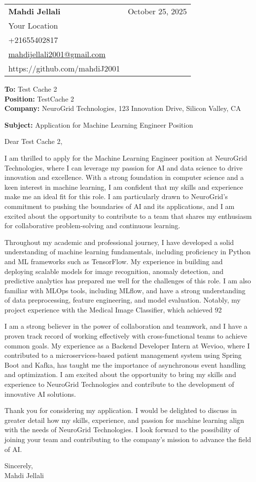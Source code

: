 \documentclass[letterpaper,11pt]{article}
\makeatletter
\newcommand{\letterHeading}[5]{
    \begin{tabular*}{\textwidth}{l@{\extracolsep{\fill}}r}
    \textbf{\Large #1} & #5 \\  %
    #2 & \\
    #3 & \\
    #4 & \\
    \end{tabular*}
    \vspace{15pt}
}
\newcommand{\letterRecipient}[3]{
    \textbf{\large To:} #1 \\
    \textbf{\large Position:} #2 \\
    \textbf{\large Company:} #3 \\
    \vspace{12pt}
}
\newcommand{\letterSubject}[1]{
    \textbf{\large Subject:} #1 \\
    \vspace{15pt}
}
\makeatother
\begin{document}
    \letterHeading
    {Mahdi Jellali}
    {Your Location}
    {+21655402817 \\ \href{mailto:mahdijellali2001@gmail.com}{mahdijellali2001@gmail.com}}
    {https://github.com/mahdiJ2001}
    {October 25, 2025}

    \letterRecipient
    {Test Cache 2}
    {TestCache 2}
    {NeuroGrid Technologies, 123 Innovation Drive, Silicon Valley, CA}

    \letterSubject{Application for Machine Learning Engineer Position}

    Dear Test Cache 2,

    I am thrilled to apply for the Machine Learning Engineer position at NeuroGrid Technologies, where I can leverage my passion for AI and data science to drive innovation and excellence. With a strong foundation in computer science and a keen interest in machine learning, I am confident that my skills and experience make me an ideal fit for this role. I am particularly drawn to NeuroGrid's commitment to pushing the boundaries of AI and its applications, and I am excited about the opportunity to contribute to a team that shares my enthusiasm for collaborative problem-solving and continuous learning.

    Throughout my academic and professional journey, I have developed a solid understanding of machine learning fundamentals, including proficiency in Python and ML frameworks such as TensorFlow. My experience in building and deploying scalable models for image recognition, anomaly detection, and predictive analytics has prepared me well for the challenges of this role. I am also familiar with MLOps tools, including MLflow, and have a strong understanding of data preprocessing, feature engineering, and model evaluation. Notably, my project experience with the Medical Image Classifier, which achieved 92%

    I am a strong believer in the power of collaboration and teamwork, and I have a proven track record of working effectively with cross-functional teams to achieve common goals. My experience as a Backend Developer Intern at Wevioo, where I contributed to a microservices-based patient management system using Spring Boot and Kafka, has taught me the importance of asynchronous event handling and optimization. I am excited about the opportunity to bring my skills and experience to NeuroGrid Technologies and contribute to the development of innovative AI solutions.

    Thank you for considering my application. I would be delighted to discuss in greater detail how my skills, experience, and passion for machine learning align with the needs of NeuroGrid Technologies. I look forward to the possibility of joining your team and contributing to the company's mission to advance the field of AI.

    Sincerely,\\[12pt]

    Mahdi Jellali
\end{document}
